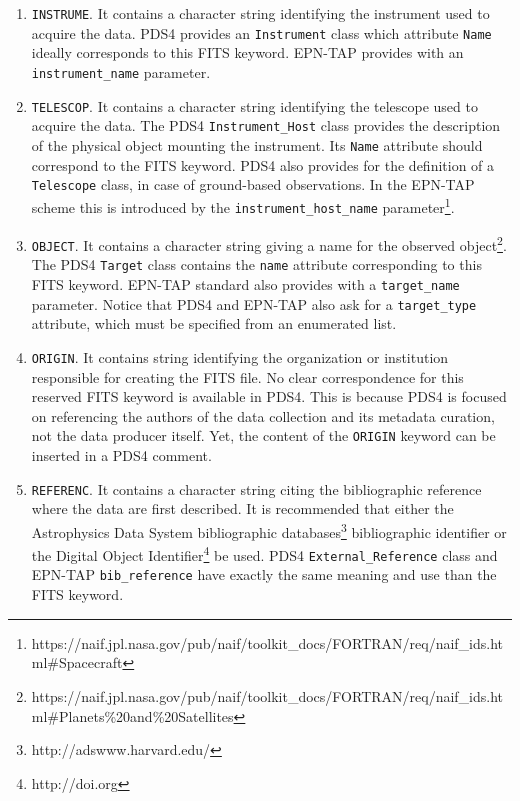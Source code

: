 \begin{enumerate}
\item{\texttt{INSTRUME}.
It contains a character string identifying the instrument used to acquire the data.
PDS4 provides an \texttt{Instrument} class which attribute \texttt{Name} ideally 
corresponds to this FITS keyword.
EPN-TAP provides with an \texttt{instrument\_name} parameter.}

\item{\texttt{TELESCOP}.
It contains a character string identifying the telescope used to acquire the data.
The PDS4 \texttt{Instrument\_Host} class provides the description of the physical object
mounting the instrument.
Its \texttt{Name} attribute should correspond to the FITS keyword.
PDS4 also provides for the definition of a \texttt{Telescope} class, in case of
ground-based observations.
In the EPN-TAP scheme this is introduced by the \texttt{instrument\_host\_name}
parameter\footnote{https://naif.jpl.nasa.gov/pub/naif/toolkit\_docs/FORTRAN/req/naif\_ids.html\#Spacecraft}.}

\item{\texttt{OBJECT}.
It contains a character string giving a name for the observed
object\footnote{https://naif.jpl.nasa.gov/pub/naif/toolkit\_docs/FORTRAN/req/naif\_ids.html\#Planets\%20and\%20Satellites}.
The PDS4 \texttt{Target} class contains the \texttt{name} attribute corresponding to
this FITS keyword.
EPN-TAP standard also provides with a \texttt{target\_name} parameter.
Notice that PDS4 and EPN-TAP also ask for a \texttt{target\_type} attribute,
which must be specified from an enumerated list.}

\item{\texttt{ORIGIN}.
It contains string identifying the organization or institution responsible for
creating the FITS file.
No clear correspondence for this reserved FITS keyword is available in PDS4.
This is because PDS4 is focused on referencing the authors of the data collection
and its metadata curation, not the data producer itself.
Yet, the content of the \texttt{ORIGIN} keyword can be inserted in a PDS4 comment.}

\item{\texttt{REFERENC}.
It contains a character string citing the bibliographic reference where the
data are first described.
It is recommended that either the Astrophysics Data System bibliographic
databases\footnote{http://adswww.harvard.edu/}
bibliographic identifier or the Digital Object Identifier\footnote{http://doi.org}
be used.
PDS4 \texttt{External\_Reference} class and EPN-TAP \texttt{bib\_reference} have
exactly the same meaning and use than the FITS keyword.}

\end{enumerate}

